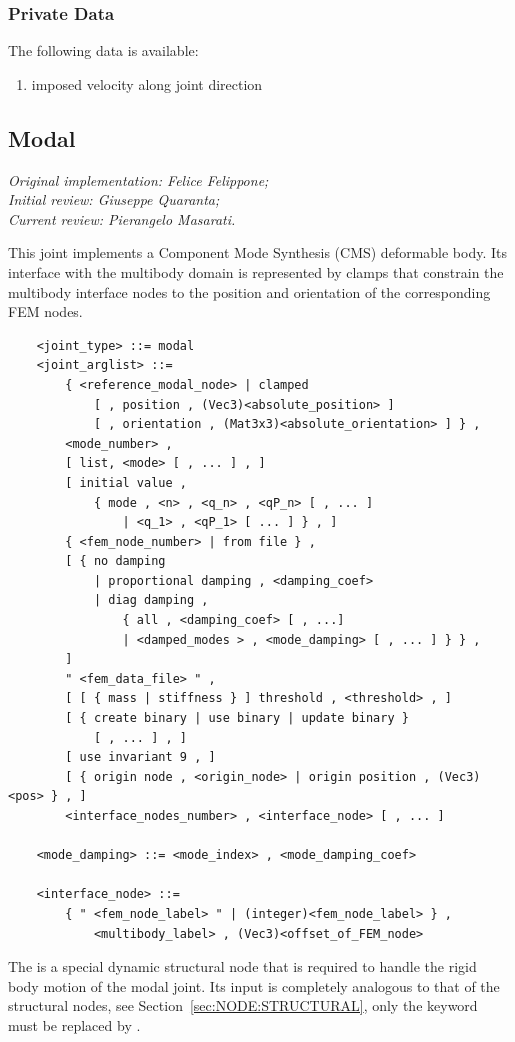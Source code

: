 \subsubsection{Private Data}
The following data is available:
\begin{enumerate}
\item {} imposed velocity along joint direction
\end{enumerate}

\subsection{Modal}\label{sec:EL:STRUCT:JOINT:MODAL}
\emph{
Original implementation: Felice Felippone; \\
Initial review: Giuseppe Quaranta; \\
Current review: Pierangelo Masarati.}

This joint implements a Component Mode Synthesis (CMS) deformable body.
Its interface with the multibody domain is represented by clamps
that constrain the multibody interface nodes to the position
and orientation of the corresponding FEM nodes.

\begin{verbatim}
    <joint_type> ::= modal
    <joint_arglist> ::=
        { <reference_modal_node> | clamped
            [ , position , (Vec3)<absolute_position> ]
            [ , orientation , (Mat3x3)<absolute_orientation> ] } ,
        <mode_number> ,
        [ list, <mode> [ , ... ] , ]
        [ initial value ,
            { mode , <n> , <q_n> , <qP_n> [ , ... ]
                | <q_1> , <qP_1> [ ... ] } , ]
        { <fem_node_number> | from file } ,
        [ { no damping 
            | proportional damping , <damping_coef>
            | diag damping ,
                { all , <damping_coef> [ , ...]
                | <damped_modes > , <mode_damping> [ , ... ] } } ,
        ]
        " <fem_data_file> " ,
        [ [ { mass | stiffness } ] threshold , <threshold> , ]
        [ { create binary | use binary | update binary }
            [ , ... ] , ]
        [ use invariant 9 , ]
        [ { origin node , <origin_node> | origin position , (Vec3)<pos> } , ]
        <interface_nodes_number> , <interface_node> [ , ... ]

    <mode_damping> ::= <mode_index> , <mode_damping_coef>

    <interface_node> ::=
        { " <fem_node_label> " | (integer)<fem_node_label> } ,
            <multibody_label> , (Vec3)<offset_of_FEM_node>
\end{verbatim}
The  is a special dynamic structural node 
that is required to handle the rigid body motion of the modal joint.
Its input is completely analogous to that of the  structural
nodes, see Section~\ref{sec:NODE:STRUCTURAL}, only the keyword  
must be replaced by .

